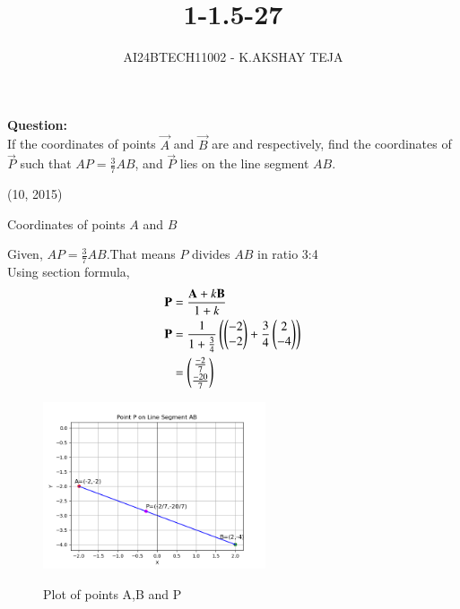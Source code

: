 \documentclass[journal]{IEEEtran}
\begin{document}

\vspace{3cm}

\title{1-1.5-27}
\author{AI24BTECH11002 - K.AKSHAY TEJA}
{\let\newpage\relax\maketitle}

\renewcommand{\thefigure}{\theenumi}
\renewcommand{\thetable}{\theenumi}
\setlength{\intextsep}{10pt} %


\renewcommand{\thetable}{\theenumi}

\textbf{Question:}\\
 If the coordinates of points $\vec{A}$ and $\vec{B}$ are  and  respectively, find the coordinates of $\vec{P}$ such that $AP = \frac{3}{7} AB$, and $\vec{P}$ lies on the line segment $AB$. 
 
    \hfill {(10, 2015)}

 \solution
 \begin{table}[h!]
	 \centering
	  
	\caption{Coordinates of points $A$ and $B$}
	 \label{tab:Coordinates}
\end{table}

Given, $AP = \frac{3}{7} AB$.That means $P$ divides $AB$ in ratio 3:4\\

Using section formula, 
\begin{align}
	\mathbf{P}&=\frac{\mathbf{A} + k\mathbf{B}}{1 + k}\\	
\mathbf{P}&=\frac{1}{1+\frac{3}{4}}\left(\begin{pmatrix}-2\\-2\end{pmatrix}+\frac{3}{4}\begin{pmatrix}2\\-4\end{pmatrix}\right)\\
	&=\begin{pmatrix}\frac{-2}{7}\\[1pt] \frac{-20}{7}\end{pmatrix}
\end{align}
		\begin{figure}[h!]    
	  \begin{center}
		\includegraphics[width=0.585\textwidth]{Figs/Fig.png}
		\label{Graph}
		  \caption{Plot of points A,B and P}  
	 \end{center}	  
	\end{figure}
\end{document}
